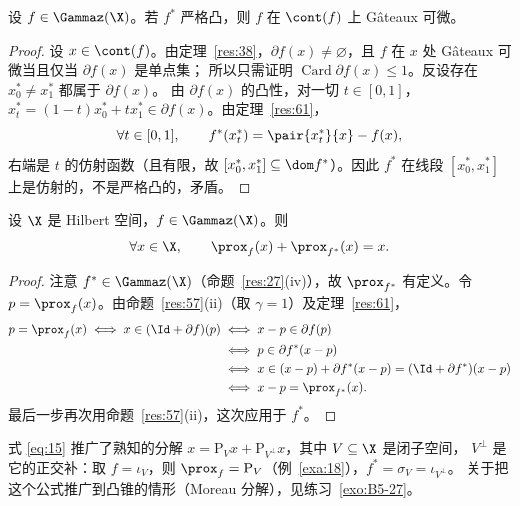 \begin{example}
\label{exa:20}
设 $f\in\Gammaz(\X)$。若 $f^*$ 严格凸，则 $f$ 在 $\cont(f)$ 上 Gâteaux 可微。
\end{example}

\begin{proof}
设 $x\in\cont(f)$。由定理~\ref{res:38}，$\partial f(x)\neq\varnothing$，且 $f$ 在 $x$ 处 Gâteaux 可微当且仅当 $\partial f(x)$ 是单点集；
所以只需证明 $\operatorname{Card}\partial f(x)\leqslant1$。反设存在 $x_0^*\neq x_1^*$ 都属于 $\partial f(x)$。
由 $\partial f(x)$ 的凸性，对一切 $t\in[0,1]$，$x_t^*=(1-t)x_0^*+tx_1^*\in\partial f(x)$。由定理~\ref{res:61}，
\[
  \forall t\in[0,1],\qquad f^*(x_t^*)=\pair{x_t^*}{x}-f(x),
\]
右端是 $t$ 的仿射函数（且有限，故 $[x_0^*,x_1^*]\subseteq\dom f^*$）。因此 $f^*$ 在线段 $[x_0^*,x_1^*]$ 上是仿射的，不是严格凸的，矛盾。
\end{proof}

\begin{corollary}[共轭函数的邻近算子]
\label{res:62}
设 $\X$ 是 Hilbert 空间，$f\in\Gammaz(\X)$。则
\begin{equation}
  \label{eq:15}
  \forall x\in\X,\qquad \prox_f(x)+\prox_{f^*}(x)=x .
\end{equation}
\end{corollary}

\begin{proof}
注意 $f^*\in\Gammaz(\X)$（命题~\ref{res:27}(iv)），故 $\prox_{f^*}$ 有定义。令 $p=\prox_f(x)$。由命题~\ref{res:57}(ii)（取 $\gamma=1$）及定理~\ref{res:61}，
\[
  \begin{aligned}
  p=\prox_f(x)\iff x\in(\Id+\partial f)(p)
  &\iff x-p\in\partial f(p)\\
  &\iff p\in\partial f^*(x-p)\\
  &\iff x\in(x-p)+\partial f^*(x-p)=(\Id+\partial f^*)(x-p)\\
  &\iff x-p=\prox_{f^*}(x).
  \end{aligned}
\]
最后一步再次用命题~\ref{res:57}(ii)，这次应用于 $f^*$。
\end{proof}

\begin{remark}
\label{rem:22}
式 \eqref{eq:15} 推广了熟知的分解 $x=\mathrm P_Vx+\mathrm P_{V^\perp}x$，其中 $V\subseteq\X$ 是闭子空间，
$V^\perp$ 是它的正交补：取 $f=\iota_V$，则 $\prox_f=\mathrm P_V$（例~\ref{exa:18}），$f^*=\sigma_V=\iota_{V^\perp}$。
关于把这个公式推广到凸锥的情形（Moreau 分解），见练习~\ref{exo:B5-27}。
\end{remark}

